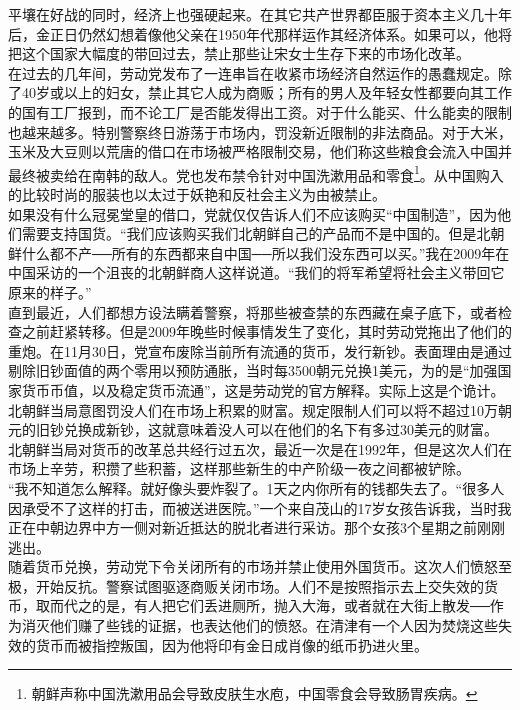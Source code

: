 平壤在好战的同时，经济上也强硬起来。在其它共产世界都臣服于资本主义几十年后，金正日仍然幻想着像他父亲在1950年代那样运作其经济体系。如果可以，他将把这个国家大幅度的带回过去，禁止那些让宋女士生存下来的市场化改革。\\

在过去的几年间，劳动党发布了一连串旨在收紧市场经济自然运作的愚蠢规定。除了40岁或以上的妇女，禁止其它人成为商贩；所有的男人及年轻女性都要向其工作的国有工厂报到，而不论工厂是否能发得出工资。对于什么能买、什么能卖的限制也越来越多。特别警察终日游荡于市场内，罚没新近限制的非法商品。对于大米，玉米及大豆则以荒唐的借口在市场被严格限制交易，他们称这些粮食会流入中国并最终被卖给在南韩的敌人。党也发布禁令针对中国洗漱用品和零食\footnote{朝鲜声称中国洗漱用品会导致皮肤生水庖，中国零食会导致肠胃疾病。}。从中国购入的比较时尚的服装也以太过于妖艳和反社会主义为由被禁止。\\

如果没有什么冠冕堂皇的借口，党就仅仅告诉人们不应该购买“中国制造”，因为他们需要支持国货。“我们应该购买我们北朝鲜自己的产品而不是中国的。但是北朝鲜什么都不产──所有的东西都来自中国──所以我们没东西可以买。”我在2009年在中国采访的一个沮丧的北朝鲜商人这样说道。“我们的将军希望将社会主义带回它原来的样子。”\\

直到最近，人们都想方设法瞒着警察，将那些被查禁的东西藏在桌子底下，或者检查之前赶紧转移。但是2009年晚些时候事情发生了变化，其时劳动党拖出了他们的重炮。在11月30日，党宣布废除当前所有流通的货币，发行新钞。表面理由是通过剔除旧钞面值的两个零用以预防通胀，当时每3500朝元兑换1美元，为的是“加强国家货币币值，以及稳定货币流通”，这是劳动党的官方解释。实际上这是个诡计。北朝鲜当局意图罚没人们在市场上积累的财富。规定限制人们可以将不超过10万朝元的旧钞兑换成新钞，这就意味着没人可以在他们的名下有多过30美元的财富。\\

北朝鲜当局对货币的改革总共经行过五次，最近一次是在1992年，但是这次人们在市场上辛劳，积攒了些积蓄，这样那些新生的中产阶级一夜之间都被铲除。\\

“我不知道怎么解释。就好像头要炸裂了。1天之内你所有的钱都失去了。“很多人因承受不了这样的打击，而被送进医院。”一个来自茂山的17岁女孩告诉我，当时我正在中朝边界中方一侧对新近抵达的脱北者进行采访。那个女孩3个星期之前刚刚逃出。\\

随着货币兑换，劳动党下令关闭所有的市场并禁止使用外国货币。这次人们愤怒至极，开始反抗。警察试图驱逐商贩关闭市场。人们不是按照指示去上交失效的货币，取而代之的是，有人把它们丢进厕所，抛入大海，或者就在大街上散发──作为消灭他们赚了些钱的证据，也表达他们的愤怒。在清津有一个人因为焚烧这些失效的货币而被指控叛国，因为他将印有金日成肖像的纸币扔进火里。\\

